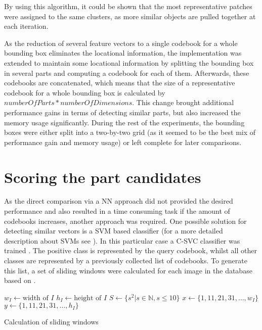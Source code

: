 By using this algorithm, it could be shown that the most representative patches were assigned to the same clusters, as more similar objects are pulled together at each iteration.

\par
As the reduction of several feature vectors to a single codebook for a whole bounding box eliminates the locational information, the implementation was extended to maintain some locational information by splitting the bounding box in several parts and computing a codebook for each of them. Afterwards, these codebooks are concatenated, which means that the size of a representative codebook for a whole bounding box is calculated by $numberOfParts * numberOfDimensions$. This change brought additional performance gains in terms of detecting similar parts, but also increased the memory usage significantly. During the rest of the experiments, the bounding boxes were either split into a two-by-two grid (as it seemed to be the best mix of performance gain and memory usage) or left complete for later comparisons.

\section{Scoring the part candidates}


As the direct comparison via a \ac{NN} approach did not provided the desired performance and also resulted in a time consuming task if the amount of codebooks increases, another approach was required. One possible solution for detecting similar vectors is a \ac{SVM} based classifier (for a more detailed description about \acp{SVM} see ). In this particular case a C-SVC classifier was trained \cite{boser1992training} \cite{cortes1995support}.
The positive class is represented by the query codebook, whilst all other classes are represented by a previously collected list of codebooks. To generate this list, a set of sliding windows were calculated for each image in the database based on .

\begin{algorithm}
    $w_I \gets \text{width of }I$\;
    $h_I \gets \text{height of }I$\;
    $S \gets \{s^2 | s \in \mathbb{N}, s \le 10 \}$\;
    $x \gets \{1, 11, 21, 31,\dots, w_I\}$\;
    $y \gets \{1, 11, 21, 31,\dots, h_I\}$\;
    \caption{Calculation of sliding windows}
    \label{alg:calc_windows}
\end{algorithm}

